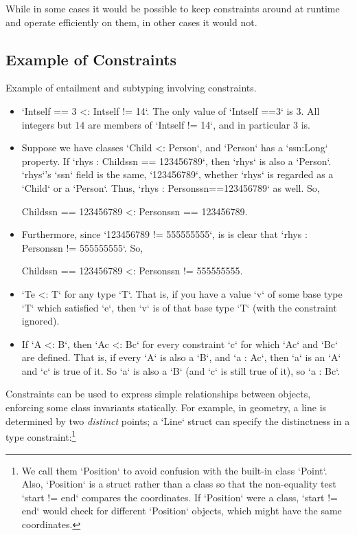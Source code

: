 While in some cases it would be possible to keep constraints around at runtime
and operate efficiently on them, in other cases it would not.  




\subsection{Example of Constraints}
\label{ConstraintExamples}

Example of entailment and subtyping involving constraints.
\begin{itemize}
\item \xcd`Int{self == 3} <: Int{self != 14}`.  The only value of
      \xcd`Int{self ==3}` is $3$.  All integers but $14$ are members of
      \xcd`Int{self != 14}`, and in particular $3$ is.  
\item Suppose we have classes \xcd`Child <: Person`, and \xcd`Person` has a
      \xcd`ssn:Long` property.  If \xcd`rhys : Child{ssn == 123456789}`, then
      \xcd`rhys` is also a \xcd`Person`.  
      \xcd`rhys`'s \xcd`ssn` field is the same, \xcd`123456789`, whether 
      \xcd`rhys` is regarded as a \xcd`Child` or a \xcd`Person`.  
      Thus, 
      \xcd`rhys : Person{ssn==123456789}` as well.  
      So, 
\begin{xtenmath}
Child{ssn == 123456789} <: Person{ssn == 123456789}.
\end{xtenmath}
\item Furthermore, since \xcd`123456789 != 555555555`, 
      is is clear that 
      \xcd`rhys : Person{ssn != 555555555}`.  
      So, 
\begin{xtenmath}
Child{ssn == 123456789} <: Person{ssn != 555555555}.  
\end{xtenmath}
\item \xcd`T{e} <: T` for any type \xcd`T`.  That is, if you have a value
      \xcd`v` of some base type \xcd`T` which satisfied \xcd`e`, then \xcd`v`
      is of that base type \xcd`T` (with the constraint ignored).
\item If \xcd`A <: B`, then \xcd`A{c} <: B{c}` for every constraint \xcd`{c}`
      for which \xcd`A{c}` and \xcd`B{c}` are defined.  That is, if every
      \xcd`A` is also a \xcd`B`, and \xcd`a : A{c}`, then 
      \xcd`a` is an \xcd`A` and \xcd`c` is true of it. So \xcd`a` is also a
      \xcd`B` (and \xcd`c` is still true of 
      it), so \xcd`a : B{c}`.  
\end{itemize}

Constraints can be used to express simple relationships between objects,
enforcing some class invariants statically.  For example, in geometry, a line
is determined by two {\em distinct} points; a \xcd`Line` struct can specify the
distinctness in a type constraint:\footnote{We call them
\xcd`Position` to avoid confusion with the built-in class \xcd`Point`. 
Also, \xcd`Position` is a struct rather than a class so that the non-equality
test \xcd`start != end` compares the coordinates.  If \xcd`Position` were a
class, \xcd`start != end` would check for different \xcd`Position` objects,
which might have the same coordinates.
}


